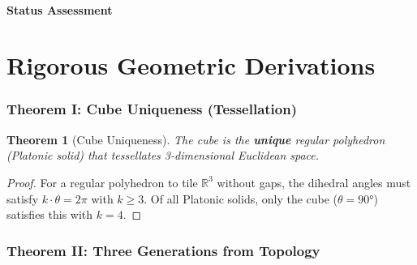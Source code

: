 \documentclass[11pt,a4paper]{article}
\theoremstyle{plain}
\newtheorem{theorem}{Theorem}[section]
\theoremstyle{definition}
\theoremstyle{remark}
\begin{document}
\subsection{Status Assessment}

\begin{center}
\end{center}

\part{Rigorous Geometric Derivations}

\section{Theorem I: Cube Uniqueness (Tessellation)}

\begin{theorem}[Cube Uniqueness]
The cube is the \textbf{unique} regular polyhedron (Platonic solid) that tessellates 3-dimensional Euclidean space.
\end{theorem}

\begin{proof}
For a regular polyhedron to tile $\mathbb{R}^3$ without gaps, the dihedral angles must satisfy $k \cdot \theta = 2\pi$ with $k \geq 3$. Of all Platonic solids, only the cube ($\theta = 90°$) satisfies this with $k = 4$.
\end{proof}

\section{Theorem II: Three Generations from Topology}
\end{document}
